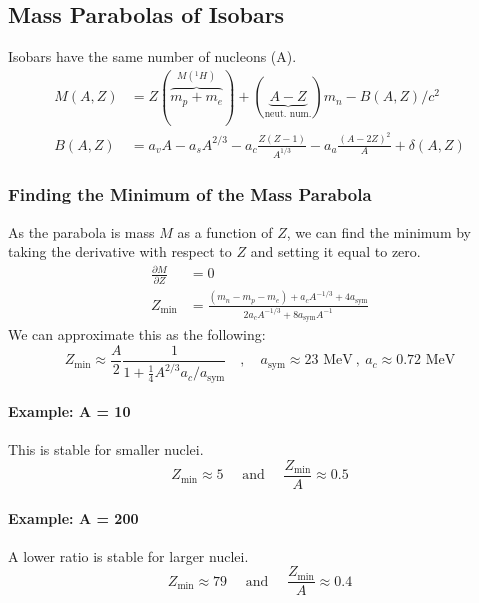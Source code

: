 \subsection{Mass Parabolas of Isobars}
Isobars have the same number of nucleons (A).
\begin{align}
M(A,Z) &= Z(\overbrace{m_p + m_e}^{M(_{}^{1}H_{})}) + (\underbrace{A-Z}_{\text{neut. num.}})m_n - B(A,Z) /c^2 \\
B(A,Z) &= a_vA - a_sA^{2 / 3} - a_c\frac{Z(Z-1)}{A^{1 / 3}} - a_a\frac{(A-2Z)^2}{A} + \delta(A,Z)
\end{align}
\subsubsection{Finding the Minimum of the Mass Parabola}
As the parabola is mass $M$ as a function of $Z$, we can find the minimum by taking the derivative with respect to $Z$ and setting it equal to zero.
\begin{align}
\frac{∂ M}{∂ Z} &= 0 \\
Z_{\text{min}} &= \frac{(m_n - m_p - m_e)+a_cA^{-1 / 3} + 4a_{\text{sym}}}{2a_{c} A^{-1 / 3} + 8a_{\text{sym}}A^{-1}}
\end{align}
We can approximate this as the following:
\begin{equation}
Z_{\text{min}} ≈ \frac{A}{2} \frac{1}{1 + \frac{1}{4}A^{2/3}a_c / a_{\text{sym}}} \quad , \quad  a_{\text{sym}} ≈ 23 \text{ MeV} \ , \ a_c ≈ 0.72 \text{ MeV}
\end{equation}

\paragraph{Example: A = 10}
This is stable for smaller nuclei. 
\begin{equation}
Z_{\text{min}} ≈ 5 \quad \text{ and } \quad  \frac{Z_{\text{min}}}{A} ≈ 0.5
\end{equation}

\paragraph{Example: A = 200}
A lower ratio is stable for larger nuclei.
\begin{equation}
Z_{\text{min}} ≈ 79 \quad \text{ and } \quad  \frac{Z_{\text{min}}}{A} ≈ 0.4
\end{equation}

